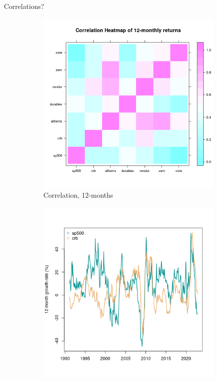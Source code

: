 \begin{frame}{Correlations?}
        \begin{figure}[h!]
        \begin{subfigure}{0.27\textwidth}
          \centering
          \includegraphics[width=\linewidth]{figures/heatmapsp500.png}
          \caption{Correlation, 12-months}
          \label{fig:sfig1}
        \end{subfigure}%
        \begin{subfigure}{0.27\textwidth}
          \centering
          \includegraphics[width=\linewidth]{figures/cumgrowth12.png}

\end{subfigure}
\end{figure}
\end{frame}
